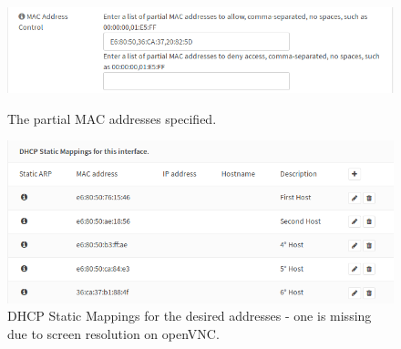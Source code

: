 \begin{figure}[H]
\centering
\begin{minipage}{.5\textwidth}
  \centering
  \includegraphics[width=1\textwidth]{dhcp_mac_rules.png}
  \caption[a]{The partial MAC addresses specified.}\label{fig:4}
\end{minipage}%
\begin{minipage}{.5\textwidth}
  \centering
  \includegraphics[width=1\textwidth]{dhcp_static_mappings.png}
  \caption[a]{DHCP Static Mappings for the desired addresses - one is missing due to screen resolution on openVNC.}\label{fig:5}
\end{minipage}
\end{figure}

